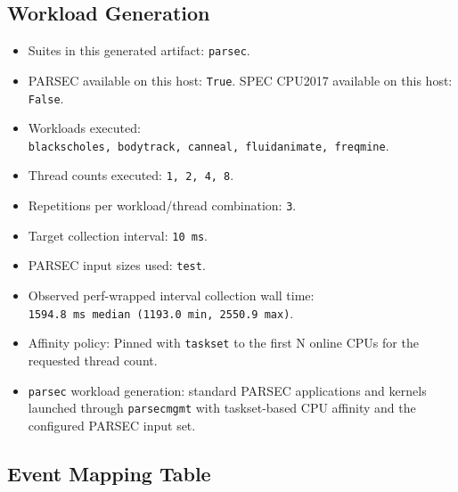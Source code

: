 \documentclass[
]{article}
\providecommand{\tightlist}{%
  \setlength{\itemsep}{0pt}\setlength{\parskip}{0pt}}
\begin{document}
\hypertarget{workload-generation}{%
\subsection{Workload Generation}\label{workload-generation}}

\begin{itemize}
\tightlist
\item
  Suites in this generated artifact: \texttt{parsec}.
\item
  PARSEC available on this host: \texttt{True}. SPEC CPU2017 available
  on this host: \texttt{False}.
\item
  Workloads executed:
  \texttt{blackscholes,\ bodytrack,\ canneal,\ fluidanimate,\ freqmine}.
\item
  Thread counts executed: \texttt{1,\ 2,\ 4,\ 8}.
\item
  Repetitions per workload/thread combination: \texttt{3}.
\item
  Target collection interval: \texttt{10\ ms}.
\item
  PARSEC input sizes used: \texttt{test}.
\item
  Observed perf-wrapped interval collection wall time:
  \texttt{1594.8\ ms\ median\ (1193.0\ min,\ 2550.9\ max)}.
\item
  Affinity policy: Pinned with \texttt{taskset} to the first N online
  CPUs for the requested thread count.
\item
  \texttt{parsec} workload generation: standard PARSEC applications and
  kernels launched through \texttt{parsecmgmt} with taskset-based CPU
  affinity and the configured PARSEC input set.
\end{itemize}

\hypertarget{event-mapping-table}{%
\subsection{Event Mapping Table}\label{event-mapping-table}}
\end{document}
